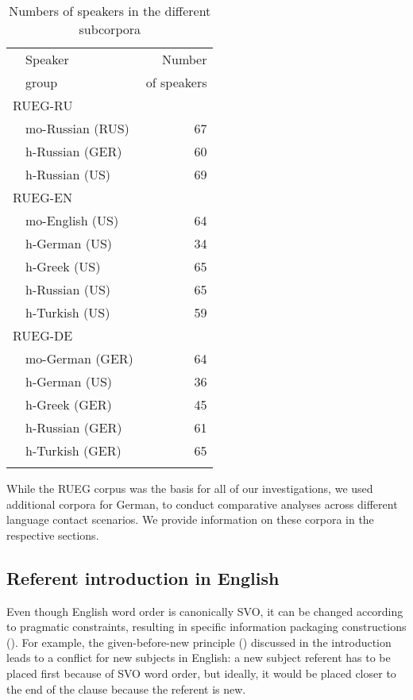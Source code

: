 \documentclass[output=paper,colorlinks,citecolor=brown]{langscibook}
\begin{document}
\begin{table}[h!]
\label{tab:bunk:speakers}
  \begin{tabular}{l lr}
    \lsptoprule
         & Speaker & Number \\
         & group   & of speakers\\
    \midrule
    \multicolumn{3}{l}{RUEG-RU} \\
         & mo-Russian (RUS) & 67\\
         & h-Russian (GER)  & 60\\
         & h-Russian (US)   & 69\\
    \multicolumn{3}{l}{RUEG-EN} \\
         & mo-English (US) & 64\\
         & h-German (US)   & 34\\
         & h-Greek (US)    & 65\\
         & h-Russian (US)  & 65\\
         & h-Turkish (US)  & 59\\
    \multicolumn{3}{l}{RUEG-DE} \\
         & mo-German (GER) & 64\\
         & h-German (US)   & 36\\
         & h-Greek (GER)   & 45\\
         & h-Russian (GER) & 61\\
         & h-Turkish (GER) & 65\\
    \lspbottomrule
  \end{tabular}
  \caption{Numbers of speakers in the different subcorpora}
  \label{bunk:Num-speak-subcorp}
\end{table}

While the RUEG corpus was the basis for all of our investigations, we used additional corpora for German, to conduct comparative analyses across different language contact scenarios. We provide information on these corpora in the respective sections.

\subsection{Referent introduction in English} 
\label{sec:bunk-ref-introduction-eng}

Even though English word order is canonically SVO, it can be changed according to pragmatic constraints, resulting in specific information packaging constructions (\cite{huddleston_syntactiv_2002}). For example, the given-before-new principle (\cite{biber_grammar_2021, hilpert_information_2021}) discussed in the introduction leads to a conflict for new subjects in English: a new subject referent has to be placed first because of SVO word order, but ideally, it would be placed closer to the end of the clause because the referent is new.
\end{document}
